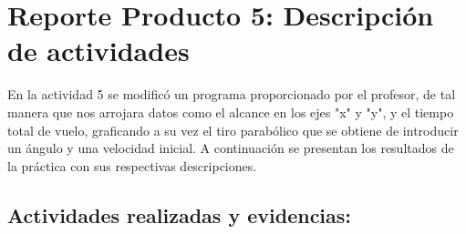 \documentclass[12pt]{article}
\begin{document}
\date{}
\section*{Reporte Producto 5: Descripción de actividades}

 En la actividad 5 se modificó un programa proporcionado por el profesor, de tal manera que nos arrojara datos como el alcance en los ejes "x" y "y", y el tiempo total de vuelo, graficando a su vez el tiro parabólico que se obtiene de introducir un ángulo y una velocidad inicial.
 A continuación se presentan los resultados de la práctica con sus respectivas descripciones.\\
 
\subsection*{Actividades realizadas y evidencias:}
 
\end{document}
